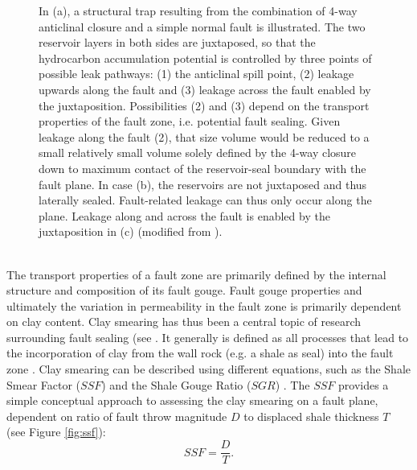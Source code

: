 \begin{figure}[h]
\begin{subfigure}{0.18\textwidth}
			\end{subfigure}
			\caption{In (a), a structural trap resulting from the combination of 4-way anticlinal closure and a simple normal fault is illustrated. The two reservoir layers in both sides are juxtaposed, so that the hydrocarbon accumulation potential is controlled by three points of possible leak pathways: (1) the anticlinal spill point, (2) leakage upwards along the fault and (3) leakage across the fault enabled by the juxtaposition. Possibilities (2) and (3) depend on the transport properties of the fault zone, i.e. potential fault sealing. Given leakage along the fault (2), that size volume would be reduced to a small relatively small volume solely defined by the 4-way closure down to maximum contact of the reservoir-seal boundary with the fault plane. In case (b), the reservoirs are not juxtaposed and thus laterally sealed. Fault-related leakage can thus only occur along the plane. Leakage along and across the fault is enabled by the juxtaposition in (c) (modified from \citet{van2003lateral}).}\label{fig:fault_trap_spills}
		\end{figure}\\
		The transport properties of a fault zone are primarily defined by the internal structure and composition of its fault gouge. Fault gouge properties and ultimately the variation in permeability in the fault zone is primarily dependent on clay content. Clay smearing has thus been a central topic of research surrounding fault sealing (see \citet{lindsay1993outcrop, yielding1997quantitative, van2003lateral, van2005processes, schmatz2010clay}. It generally is defined as all processes that lead to the incorporation of clay from the wall rock (e.g. a shale as seal) into the fault zone \citep{van2003lateral, vrolijk2016clay}. Clay smearing can be described using different equations, such as the Shale Smear Factor ($SSF$) and the Shale Gouge Ratio ($SGR$) \citep{lindsay1993outcrop, yielding1997quantitative, vrolijk2016clay}. The $SSF$ provides a simple conceptual approach to assessing the clay smearing on a fault plane, dependent on ratio of fault throw magnitude $D$ to displaced shale thickness $T$ \citep{lindsay1993outcrop, yielding1997quantitative, yielding2012using} (see Figure \ref{fig:ssf}):
		\begin{equation}
			SSF = \frac{D}{T}.
		\end{equation}
